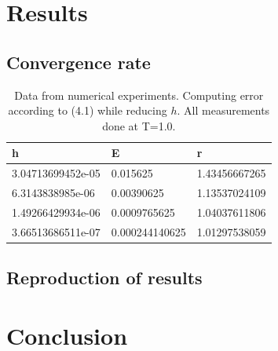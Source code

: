 \documentclass[11pt,a4paper,draft]{article}
\numberwithin{equation}{section}
\begin{document}
\section{Results}

\subsection{Convergence rate}

\begin{table}[H]
\centering
  \caption{Data from numerical experiments. Computing error according to (4.1) while reducing $h$. All measurements done at T=1.0.}
\vspace{2mm}

\begin{tabular}{ |l|l|l| }
  \hline
  \textbf{h} & \textbf{E} & \textbf{r} \\
  \hline
3.04713699452e-05 &	0.015625 &	1.43456667265 \\
\hline
6.3143838985e-06 &	0.00390625 &	 1.13537024109 \\ 
\hline
1.49266429934e-06 &	0.0009765625 &	 1.04037611806 \\
\hline
3.66513686511e-07 &	0.000244140625 & 	1.01297538059  \\
  \hline 
\end{tabular}
\vspace{0.2cm}
\end{table}


\subsection{Reproduction of results}

\section{Conclusion}



\printbibliography
\end{document}
